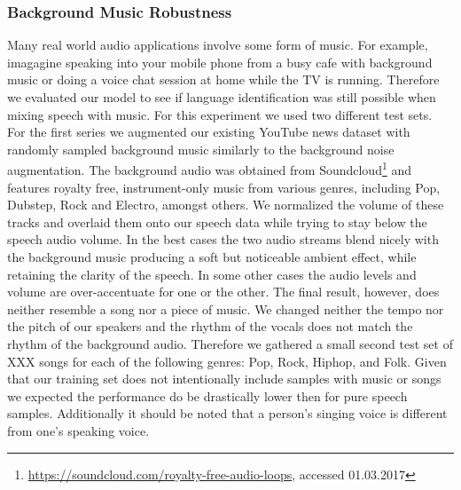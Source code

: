 \subsubsection{Background Music Robustness} 
\label{sec:music_robustness}
Many real world audio applications involve some form of music. For example, imagagine speaking into your mobile phone from a busy cafe with background music or doing a voice chat session at home while the TV is running. Therefore we evaluated our model to see if language identification was still possible when mixing speech with music. For this experiment we used two different test sets. For the first series we augmented our existing YouTube news dataset with randomly sampled background music similarly to the background noise augmentation. The background audio was obtained from Soundcloud\footnote{\url{https://soundcloud.com/royalty-free-audio-loops}, accessed 01.03.2017} and features royalty free, instrument-only music from various genres, including Pop, Dubstep, Rock and Electro, amongst others. 
We normalized the volume of these tracks and overlaid them onto our speech data while trying to stay below the speech audio volume. In the best cases the two audio streams blend nicely with the background music producing a soft but noticeable ambient effect, while retaining the clarity of the speech. In some other cases the audio levels and volume are over-accentuate for one or the other. The final result, however, does neither resemble a song nor a piece of music. We changed neither the tempo nor the pitch of our speakers and the rhythm of the vocals does not match the rhythm of the background audio. Therefore we gathered a small second test set of XXX  songs for each of the following genres: Pop, Rock, Hiphop, and Folk. 
Given that our training set does not intentionally include samples with music or songs we expected the performance do be drastically lower then for pure speech samples. Additionally it should be noted that a person's singing voice is different from one's speaking voice. 


